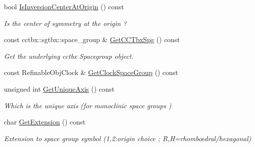 \begin{DoxyCompactItemize}
\mbox{\label{class_obj_cryst_1_1_space_group_a516ca407fbc80a8786fcdd6821668c58}} 
bool \mbox{\hyperlink{class_obj_cryst_1_1_space_group_a516ca407fbc80a8786fcdd6821668c58}{Is\+Inversion\+Center\+At\+Origin}} () const
\begin{DoxyCompactList}\small\item\em Is the center of symmetry at the origin ? \end{DoxyCompactList}\item 
\mbox{\label{class_obj_cryst_1_1_space_group_af75d004f6bb49e14acc5bcd06bf8dda6}} 
const cctbx\+::sgtbx\+::space\+\_\+group \& \mbox{\hyperlink{class_obj_cryst_1_1_space_group_af75d004f6bb49e14acc5bcd06bf8dda6}{Get\+C\+C\+Tbx\+Spg}} () const
\begin{DoxyCompactList}\small\item\em Get the underlying cctbx Spacegroup object. \end{DoxyCompactList}\item 
const Refinable\+Obj\+Clock \& \mbox{\hyperlink{class_obj_cryst_1_1_space_group_ad654f4826b6ca9fd2ad021286ed703ac}{Get\+Clock\+Space\+Group}} () const
\item 
\mbox{\label{class_obj_cryst_1_1_space_group_a62966718407e7b2c666ffe376832ce31}} 
unsigned int \mbox{\hyperlink{class_obj_cryst_1_1_space_group_a62966718407e7b2c666ffe376832ce31}{Get\+Unique\+Axis}} () const
\begin{DoxyCompactList}\small\item\em Which is the unique axis (for monoclinic space groups ) \end{DoxyCompactList}\item 
\mbox{\label{class_obj_cryst_1_1_space_group_a1c0dbd14dc315655333acedbc4289a94}} 
char \mbox{\hyperlink{class_obj_cryst_1_1_space_group_a1c0dbd14dc315655333acedbc4289a94}{Get\+Extension}} () const
\begin{DoxyCompactList}\small\item\em Extension to space group symbol (\textquotesingle{}1\textquotesingle{},\textquotesingle{}2\textquotesingle{}\+:origin choice ; \textquotesingle{}R\textquotesingle{},\textquotesingle{}H\textquotesingle{}=rhomboedral/hexagonal) \end{DoxyCompactList}\item 

\end{DoxyCompactItemize}
